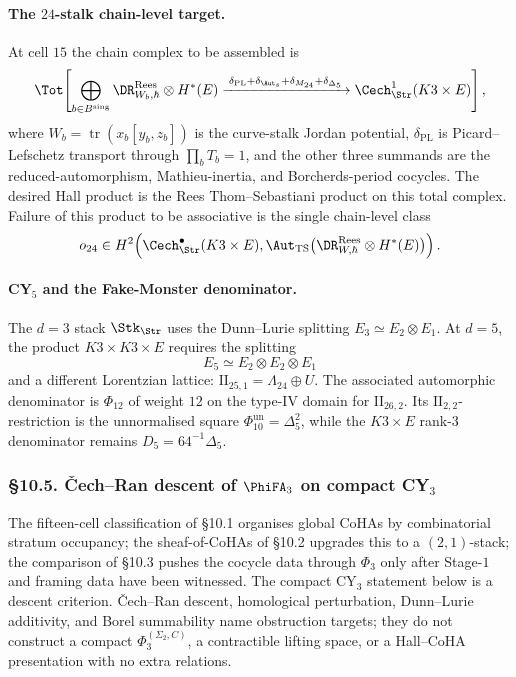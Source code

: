 \paragraph{The \(24\)-stalk chain-level target.}
At cell \(15\) the chain complex to be assembled is
\[
 \Tot\!\left[
 \bigoplus_{b\in B^{\mathrm{sing}}}
 \DR_{W_b,\hbar}^{\mathrm{Rees}}\otimes H^\ast(E)
 \xrightarrow{\;\delta_{\mathrm{PL}}+\delta_{\Aut_s}
 +\delta_{M_{24}}+\delta_{\Delta_5}\;}
 \Cech^1_{\Str}(K3\times E)
 \right],
\]
where \(W_b=\operatorname{tr}(x_b[y_b,z_b])\) is the curve-stalk
Jordan potential, \(\delta_{\mathrm{PL}}\) is Picard--Lefschetz
transport through \(\prod_bT_b=1\), and the other three summands are
the reduced-automorphism, Mathieu-inertia, and Borcherds-period
cocycles. The desired Hall product is the Rees Thom--Sebastiani
product on this total complex. Failure of this product to be
associative is the single chain-level class
\[
 o_{24}\in
 H^2\!\left(\Cech^\bullet_{\Str}(K3\times E),
 \Aut_{\mathrm{TS}}\bigl(\DR_{W,\hbar}^{\mathrm{Rees}}\otimes H^\ast(E)\bigr)
 \right).
\]

\paragraph{CY$_5$ and the Fake-Monster denominator.}
The \(d=3\) stack \(\Stk_{\Str}\) uses the Dunn--Lurie splitting
\(E_3\simeq E_2\otimes E_1\). At \(d=5\), the product
\(K3\times K3\times E\) requires the splitting
\[
 E_5\simeq E_2\otimes E_2\otimes E_1
\]
and a different Lorentzian lattice:
\(\mathrm{II}_{25,1}=\Lambda_{24}\oplus U\). The associated
automorphic denominator is \(\Phi_{12}\) of weight \(12\) on the
type-IV domain for \(\mathrm{II}_{26,2}\). Its
\(\mathrm{II}_{2,2}\)-restriction is the unnormalised square
\(\Phi_{10}^{\mathrm{un}}=\Delta_5^2\), while
the \(K3\times E\) rank-\(3\) denominator remains \(D_5=64^{-1}\Delta_5\).

\subsubsection{\S 10.5. \v{C}ech--Ran descent of $\PhiFA_{3}$ on compact
CY$_{3}$}
\label{gluing:sec:10-5-cech-ran-descent}

The fifteen-cell classification of \S 10.1 organises global CoHAs by
combinatorial stratum occupancy; the sheaf-of-CoHAs of \S 10.2 upgrades
this to a $(2,1)$-stack; the comparison of \S 10.3 pushes
the cocycle data through $\Phi_{3}$ only after Stage-$1$ and framing
data have been witnessed. The compact CY$_3$ statement below is a
descent criterion. \v{C}ech--Ran descent, homological perturbation,
Dunn--Lurie additivity, and Borel summability name obstruction targets;
they do not construct a compact $\Phi_3^{(\Sigma_2, C)}$, a
contractible lifting space, or a Hall--CoHA presentation with no
extra relations.

